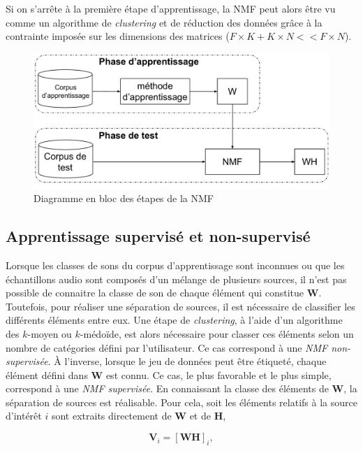 Si on s'arrête à la première étape d'apprentissage, la NMF peut alors être vu comme un algorithme de \textit{clustering} \cite{li2006relationships} et de réduction des données grâce à la contrainte imposée sur les dimensions des matrices ($F \times K + K \times N << F \times N$).

\begin{figure}[ht]
\centering
\includegraphics[width=.8\linewidth]{./figures/NMF/NMF_apprentissage.pdf}
\caption{Diagramme en bloc des étapes de la NMF}
\label{fig:supervised_learning}
\end{figure}

\subsection{Apprentissage supervisé et non-supervisé}
Lorsque les classes de sons du corpus d'apprentissage sont inconnues ou que les échantillons audio sont composés d'un mélange de plusieurs sources, il n'est pas possible de connaitre la classe de son de chaque élément qui constitue $\mathbf{W}$. Toutefois, pour réaliser une séparation de sources, il est nécessaire de classifier les différents éléments entre eux. Une étape de \textit{clustering}, à l'aide d'un algorithme des $k$-moyen ou $k$-médoïde, est alors nécessaire pour classer ces éléments selon un nombre de catégories défini par l'utilisateur. Ce cas correspond à une \textit{NMF non-supervisée}.
À l'inverse, lorsque le jeu de données peut être étiqueté, chaque élément défini dans $\mathbf{W}$ est connu. Ce cas, le plus favorable et le plus simple, correspond à une \textit{NMF supervisée}.
En connaissant la classe des éléments de $\mathbf{W}$, la séparation de sources est réalisable. Pour cela, soit les éléments relatifs à la source d'intérêt $i$ sont extraits directement de $\mathbf{W}$ et de $\mathbf{H}$,

\begin{equation}
\mathbf{V}_i = \left[\mathbf{WH}\right]_i,
\end{equation}


